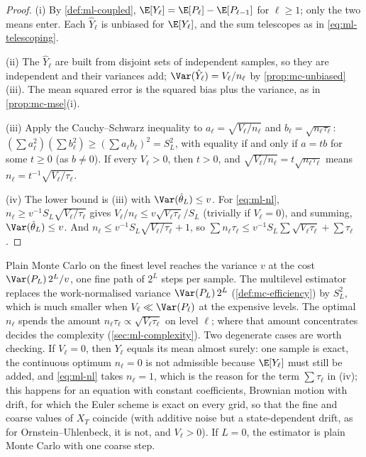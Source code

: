 \begin{proof}
(i) By \cref{def:ml-coupled}, $\E[Y_\ell]=\E[P_\ell]-\E[P_{\ell-1}]$ for $\ell\ge1$; only the
two means enter. Each $\hat Y_\ell$ is unbiased for $\E[Y_\ell]$, and the sum telescopes as
in \eqref{eq:ml-telescoping}.

(ii) The $\hat Y_\ell$ are built from disjoint sets of independent samples, so they are
independent and their variances add; $\Var(\hat Y_\ell)=V_\ell/n_\ell$ by
\cref{prop:mc-unbiased}(iii). The mean squared error is the squared bias plus the variance,
as in \cref{prop:mc-mse}(i).

(iii) Apply the Cauchy--Schwarz inequality to $a_\ell=\sqrt{V_\ell/n_\ell}$ and
$b_\ell=\sqrt{n_\ell\tau_\ell}$: $(\sum a_\ell^2)(\sum b_\ell^2)\ge(\sum a_\ell b_\ell)^2=S_L^2$,
with equality if and only if $a=tb$ for some $t\ge0$ (as $b\ne0$). If every $V_\ell>0$, then
$t>0$, and $\sqrt{V_\ell/n_\ell}=t\sqrt{n_\ell\tau_\ell}$ means $n_\ell=t^{-1}\sqrt{V_\ell/\tau_\ell}$.

(iv) The lower bound is (iii) with $\Var(\hat\theta_L)\le v$. For \eqref{eq:ml-nl},
$n_\ell\ge v^{-1}S_L\sqrt{V_\ell/\tau_\ell}$ gives $V_\ell/n_\ell\le v\sqrt{V_\ell\tau_\ell}/S_L$
(trivially if $V_\ell=0$), and summing, $\Var(\hat\theta_L)\le v$. And
$n_\ell\le v^{-1}S_L\sqrt{V_\ell/\tau_\ell}+1$, so
$\sum n_\ell\tau_\ell\le v^{-1}S_L\sum\sqrt{V_\ell\tau_\ell}+\sum\tau_\ell$.
\end{proof}

Plain Monte Carlo on the finest level reaches the variance $v$ at the cost
$\Var(P_L)\,2^L/v$, one fine path of $2^L$ steps per sample. The multilevel estimator replaces the
work-normalised variance $\Var(P_L)\,2^L$ (\cref{def:mc-efficiency}) by $S_L^2$, which is much
smaller when $V_\ell\ll\Var(P_\ell)$ at the expensive levels. The optimal $n_\ell$ spends the
amount $n_\ell\tau_\ell\propto\sqrt{V_\ell\tau_\ell}$ on level $\ell$; where that amount
concentrates decides the complexity (\cref{sec:ml-complexity}). Two degenerate cases are worth
checking. If $V_\ell=0$, then $Y_\ell$ equals its mean almost surely: one sample is exact, the
continuous optimum $n_\ell=0$ is not admissible because $\E[Y_\ell]$ must still be added, and
\eqref{eq:ml-nl} takes $n_\ell=1$, which is the reason for the term $\sum\tau_\ell$ in (iv);
this happens for an equation with constant coefficients, Brownian motion with drift, for which
the Euler scheme is exact on every grid, so that the fine and coarse values of $X_T$ coincide (with
additive noise but a state-dependent drift, as for Ornstein--Uhlenbeck, it is not, and $V_\ell>0$). If
$L=0$, the estimator is plain Monte Carlo with one coarse step.

